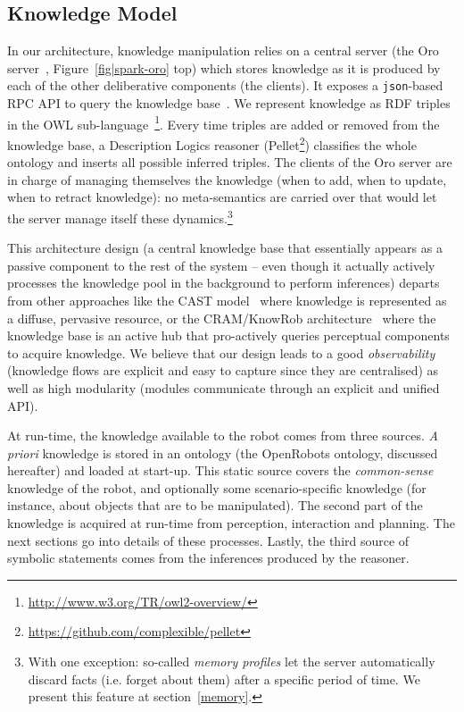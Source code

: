 \documentclass[preprint,3p,times]{elsarticle}
\newcommand{\ie}{i.e.\xspace}
\begin{document}
\subsection{Knowledge Model}

In our architecture, knowledge manipulation relies on a central server (the {\sc
Oro} server~\cite{Lemaignan2010}, Figure~\ref{fig|spark-oro} top) which stores
knowledge as it is produced by each of the other deliberative components (the
clients). It exposes a {\tt json}-based RPC API to query the knowledge
base~\cite{lemaignan2012kbapi}.  We represent knowledge as RDF triples in the
OWL sub-language~\footnote{\url{http://www.w3.org/TR/owl2-overview/}}. Every
time triples are added or removed from the knowledge base, a Description Logics
reasoner ({\sc Pellet}\footnote{\url{https://github.com/complexible/pellet}})
classifies the whole ontology and inserts all possible inferred triples.  The
clients of the {\sc Oro} server are in charge of managing themselves the
knowledge (when to add, when to update, when to retract knowledge): no
meta-semantics are carried over that would let the server manage itself these
dynamics.\footnote{With one exception: so-called \emph{memory profiles} let the
server automatically discard facts (\ie forget about them) after a specific
period of time. We present this feature at section~\ref{memory}.}

This architecture design (a central knowledge base that essentially appears as a
passive component to the rest of the system -- even though it actually actively
processes the knowledge pool in the background to perform inferences)
departs from other approaches like the CAST model~\cite{Hawes2007} where
knowledge is represented as a diffuse, pervasive resource, or the CRAM/KnowRob
architecture~\cite{Beetz2010} where the knowledge base is an active hub that
pro-actively queries perceptual components to acquire knowledge. We believe that
our design leads to a good \emph{observability} (knowledge flows are explicit
and easy to capture since they are centralised) as well as high modularity
(modules communicate through an explicit and unified API).

At run-time, the knowledge available to the robot comes from three sources. {\it
A priori} knowledge is stored in an ontology (the {\sc OpenRobots} ontology,
discussed hereafter) and loaded at start-up. This static source covers the
\emph{common-sense} knowledge of the robot, and optionally some
scenario-specific knowledge (for instance, about objects that are to be
manipulated). The second part of the knowledge is acquired at run-time from
perception, interaction and planning. The next sections go into details of these
processes. Lastly, the third source of symbolic statements comes from the
inferences produced by the reasoner.
\end{document}
